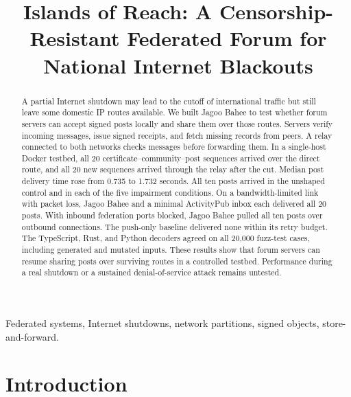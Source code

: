 \documentclass[conference,a4paper,10pt]{IEEEtran}
\begin{document}
\title{Islands of Reach: A Censorship-Resistant Federated Forum for
National Internet Blackouts}

\author{%
}

\maketitle
\thispagestyle{iccitfirstpage}

\begin{abstract}
A partial Internet shutdown may lead to the cutoff of international traffic but still leave some domestic IP routes available. We built Jagoo Bahee to test whether forum servers can accept signed posts locally and share them over those routes. Servers verify incoming messages, issue signed receipts, and fetch missing records from peers. A relay connected to both networks checks messages before forwarding them. In a single-host Docker testbed, all 20 certificate--community--post sequences arrived over the direct route, and all 20 new sequences arrived through the relay after the cut. Median post delivery time rose from 0.735 to 1.732 seconds. All ten posts arrived in the unshaped control and in each of the five impairment conditions. On a bandwidth-limited link with packet loss, Jagoo Bahee and a minimal ActivityPub inbox each delivered all 20 posts. With inbound federation ports blocked, Jagoo Bahee pulled all ten posts over outbound connections. The push-only baseline delivered none within its retry budget. The TypeScript, Rust, and Python decoders agreed on all 20,000 fuzz-test cases, including generated and mutated inputs. These results show that forum servers can resume sharing posts over surviving routes in a controlled testbed. Performance during a real shutdown or a sustained denial-of-service attack remains untested.
\end{abstract}

\begin{IEEEkeywords}
Federated systems, Internet shutdowns, network partitions, signed objects, store-and-forward.
\end{IEEEkeywords}

\section{Introduction}
\end{document}
